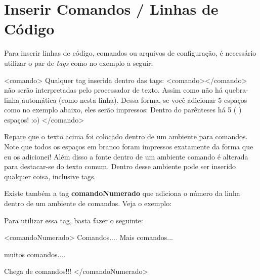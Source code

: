 \newpage \chapter{Inserir Comandos / Linhas de Código}\setcounter{SteP}{1}
\label{xxx}

Para inserir linhas de código, comandos ou arquivos de configuração, é necessário utilizar o par de {\it tags} como no exemplo a seguir:

\begin{BoxVerbatim}
    <comando>
           Qualquer tag inserida dentro das tags: <comando></comando>
       não serão interpretadas pelo processador de texto. Assim como não há quebra-linha
       automática (como nesta linha).
           Dessa forma, se você adicionar 5 espaços como no exemplo abaixo,
      eles serão impressos:
           Dentro do parênteses há 5 (     ) espaços! :o)
    </comando>
\end{BoxVerbatim}

    Repare que o texto acima foi colocado dentro de um ambiente para comandos. Note que todos os espaços em branco foram impressos exatamente da forma que eu os adicionei! Além disso a fonte dentro de um ambiente comando é alterada para destacar-se do texto comum. Dentro desse ambiente pode ser inserido qualquer coisa, inclusive tags.

 Existe também a tag {\bf comandoNumerado} que adiciona o número da linha
 dentro de um ambiente de comandos. Veja o exemplo:

\begin{VerbatimNumerado}
Para utilizar essa tag, basta fazer o seguinte:

<comandoNumerado>
Comandos....
Mais comandos...

muitos comandos....

Chega de comandos!!!
</comandoNumerado>
\end{VerbatimNumerado}
